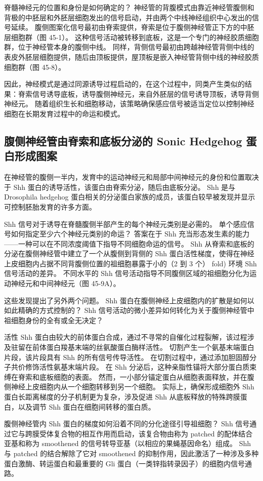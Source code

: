 脊髓神经元的位置和身份是如何确定的？ 神经管的背腹模式由靠近神经管腹侧和背极的中胚层和外胚层细胞发出的信号启动，并由两个中线神经组织中心发出的信号延续。 腹侧图案化信号最初由脊索提供，脊索是位于腹侧神经管正下方的中胚层细胞群（图 45-1）。 这种信号活动被转移到底板，这是一个专门的神经胶质细胞群，位于神经管本身的腹侧中线。 同样，背侧信号最初由跨越神经管背侧中线的表皮外胚层细胞提供，随后由顶板提供，屋顶板是嵌入神经管背侧中线的神经胶质细胞群（图 45-8）。

因此，神经模式是通过同源诱导过程启动的，在这个过程中，同类产生类似的结果：脊索信号诱导底板，诱导腹侧神经元，来自外胚层的信号诱导顶板，诱导背侧神经元。 随着组织生长和细胞移动，该策略确保感应信号被适当定位以控制神经细胞在长期发育过程中的命运和模式。

\subsection{腹侧神经管由脊索和底板分泌的 Sonic Hedgehog 蛋白形成图案}
在神经管的腹侧一半内，发育中的运动神经元和局部中间神经元的身份和位置取决于 Shh 蛋白的诱导活性，该蛋白由脊索分泌，随后由底板分泌。 Shh 是与 Drosophila hedgehog 蛋白相关的分泌蛋白家族的成员，该蛋白较早被发现并显示可控制胚胎发育的许多方面。

Shh 信号对于诱导在脊髓腹侧半部产生的每个神经元类别是必需的。 单个感应信号如何指定至少六个神经元类别的命运？ 答案在于 Shh 充当形态发生素的能力——一种可以在不同浓度阈值下指导不同细胞命运的信号。 Shh 从脊索和底板的分泌在腹侧神经管中建立了一个从腹侧到背侧的 Shh 蛋白活性梯度，使得在神经上皮细胞内占据不同背腹侧位置的祖细胞暴露于小的（2 到 3 个） fold) 环境 Shh 信号活动的差异。 不同水平的 Shh 信号活动指导不同腹侧区域的祖细胞分化为运动神经元和中间神经元（图 45-9A）。

这些发现提出了另外两个问题。 Shh 蛋白在腹侧神经上皮细胞内的扩散是如何以如此精确的方式控制的？ Shh 信号活动的微小差异如何转化为关于腹侧神经管中祖细胞身份的全有或全无决定？

活性 Shh 蛋白由较大的前体蛋白合成，通过不寻常的自催化过程裂解，该过程涉及驻留在前体蛋白羧基末端的丝氨酸蛋白酶样活性。 切割产生一个氨基末端蛋白片段，该片段具有 Shh 的所有信号传导活性。 在切割过程中，通过添加胆固醇分子共价修饰活性氨基末端片段。 在 Shh 分泌后，这种亲脂性锚将大部分蛋白质束缚在脊索和底板细胞的表面。 然而，一小部分锚定蛋白从细胞表面释放，并在腹侧神经上皮细胞内从一个细胞转移到另一个细胞。 实际上，确保形成细胞外 Shh 蛋白长距离梯度的分子机制更为复杂，涉及促进 Shh 从底板释放的特殊跨膜蛋白，以及调节 Shh 蛋白在细胞间转移的蛋白质。

腹侧神经管内 Shh 蛋白的梯度如何沿着不同的分化途径引导祖细胞？ Shh 信号通过它与跨膜受体复合物的相互作用而启动，该复合物由称为 patched 的配体结合亚基和称为 smoothened 的信号转导亚基（以相应的果蝇基因命名）组成。 Shh 与 patched 的结合解除了它对 smoothened 的抑制作用，因此激活了一种涉及多种蛋白激酶、转运蛋白和最重要的 Gli 蛋白（一类锌指转录因子）的细胞内信号通路。

